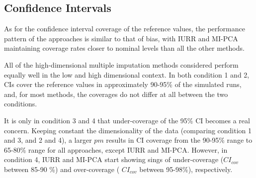 \subsection{Confidence Intervals} 

As for the confidence interval coverage of the reference values, the performance pattern of the approaches is similar
to that of bias, with IURR and MI-PCA maintaining coverage rates closer to nominal levels than all the other methods. 

All of the high-dimensional multiple imputation methods considered perform equally well in the low and high dimensional 
context. In both condition 1 and 2, CIs cover the reference values in approximately 90-95\% of the simulated runs, and, 
for most methods, the coverages do not differ at all between the two conditions.

It is only in condition 3 and 4 that under-coverage of the 95\% CI becomes a real concern. 
Keeping constant the dimensionality of the data (comparing condition 1 and 3, and 2 and 4), a larger $pm$ results in CI 
coverage from the 90-95\% range to 65-80\% range for all approaches, except IURR and MI-PCA. However, in condition 4, 
IURR and MI-PCA start showing sings of under-coverage ($CI_{cov}$ between 85-90 \%) and over-coverage ( $CI_{cov}$ between 
95-98\%), respectively.





